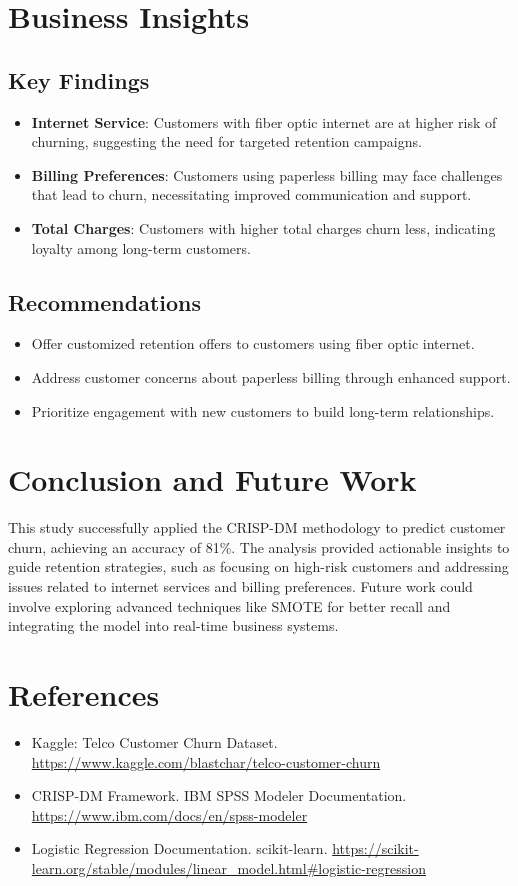 \documentclass[12pt]{article}
\begin{document}
\section{Business Insights}

\subsection{Key Findings}
\begin{itemize}
    \item \textbf{Internet Service}: Customers with fiber optic internet are at higher risk of churning, suggesting the need for targeted retention campaigns.
    \item \textbf{Billing Preferences}: Customers using paperless billing may face challenges that lead to churn, necessitating improved communication and support.
    \item \textbf{Total Charges}: Customers with higher total charges churn less, indicating loyalty among long-term customers.
\end{itemize}

\subsection{Recommendations}
\begin{itemize}
    \item Offer customized retention offers to customers using fiber optic internet.
    \item Address customer concerns about paperless billing through enhanced support.
    \item Prioritize engagement with new customers to build long-term relationships.
\end{itemize}

\section{Conclusion and Future Work}

This study successfully applied the CRISP-DM methodology to predict customer churn, achieving an accuracy of 81\%. The analysis provided actionable insights to guide retention strategies, such as focusing on high-risk customers and addressing issues related to internet services and billing preferences. Future work could involve exploring advanced techniques like SMOTE for better recall and integrating the model into real-time business systems.

\section{References}
\begin{itemize}
    \item Kaggle: Telco Customer Churn Dataset. \url{https://www.kaggle.com/blastchar/telco-customer-churn}
    \item CRISP-DM Framework. IBM SPSS Modeler Documentation. \url{https://www.ibm.com/docs/en/spss-modeler}
    \item Logistic Regression Documentation. scikit-learn. \url{https://scikit-learn.org/stable/modules/linear_model.html#logistic-regression}
\end{itemize}
\end{document}
